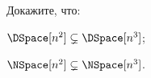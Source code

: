 Докажите, что:
\begin{enumcyr}
    \item $\DSpace[n^2] \subsetneq \DSpace[n^3]$;
    \item $\NSpace[n^2] \subsetneq \NSpace[n^3]$.
\end{enumcyr}